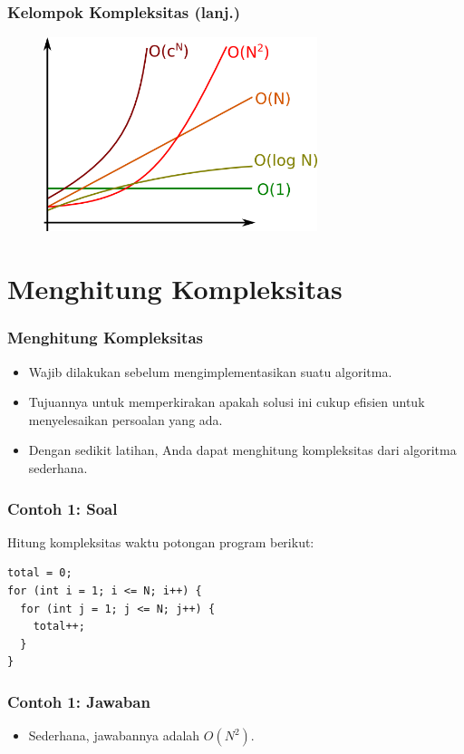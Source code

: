\begin{frame}
\frametitle{Kelompok Kompleksitas (lanj.)}
\begin{figure}
  \includegraphics[width=8cm]{asset/grafik.png}
\end{figure}
\end{frame}

\section{Menghitung Kompleksitas}
\frame{\sectionpage}

\begin{frame}
\frametitle{Menghitung Kompleksitas}
\begin{itemize}
  \item Wajib dilakukan sebelum mengimplementasikan suatu algoritma.
  \item Tujuannya untuk memperkirakan apakah solusi ini cukup efisien untuk menyelesaikan persoalan yang ada.
  \item Dengan sedikit latihan, Anda dapat menghitung kompleksitas dari algoritma sederhana.
\end{itemize}
\end{frame}

\begin{frame}[fragile]
\frametitle{Contoh 1: Soal}
Hitung kompleksitas waktu potongan program berikut:

\hfill

\begin{lstlisting}
total = 0;
for (int i = 1; i <= N; i++) {
  for (int j = 1; j <= N; j++) {
    total++;
  }
}
\end{lstlisting}
\end{frame}

\begin{frame}
\frametitle{Contoh 1: Jawaban}
\begin{itemize}
  \item Sederhana, jawabannya adalah $O(N^2)$.
\end{itemize}
\end{frame}

